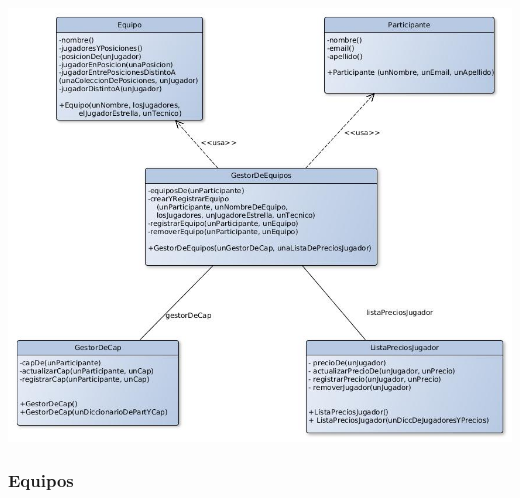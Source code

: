 \begin{center}
\includegraphics[scale=0.4]{diseno/gestorDeEquipos.jpg}
\end{center}

\subsubsection{Equipos}

